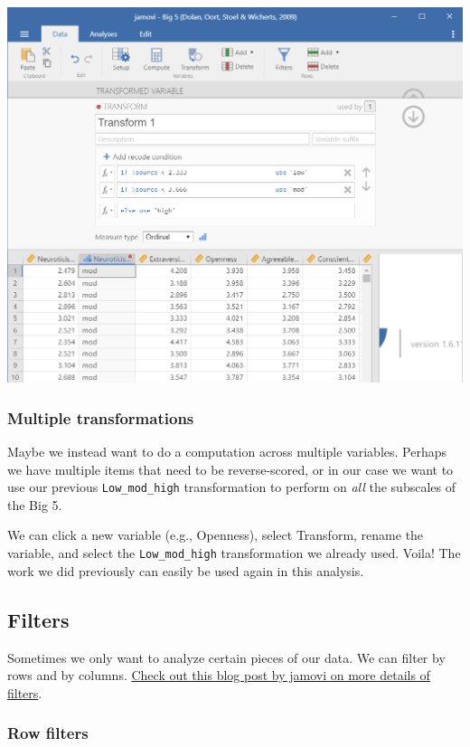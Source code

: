 \documentclass[
]{book}
\begin{document}
\includegraphics{images/03-jamovi/transform2.png}

\hypertarget{multiple-transformations}{%
\subsubsection{Multiple transformations}\label{multiple-transformations}}

Maybe we instead want to do a computation across multiple variables. Perhaps we have multiple items that need to be reverse-scored, or in our case we want to use our previous \texttt{Low\_mod\_high} transformation to perform on \emph{all} the subscales of the Big 5.

We can click a new variable (e.g., Openness), select Transform, rename the variable, and select the \texttt{Low\_mod\_high} transformation we already used. Voila! The work we did previously can easily be used again in this analysis.

\hypertarget{filters}{%
\subsection{Filters}\label{filters}}

Sometimes we only want to analyze certain pieces of our data. We can filter by rows and by columns. \href{https://blog.jamovi.org/2018/04/25/jamovi-filters.html}{Check out this blog post by jamovi on more details of filters}.

\hypertarget{row-filters}{%
\subsubsection{Row filters}\label{row-filters}}
\end{document}

